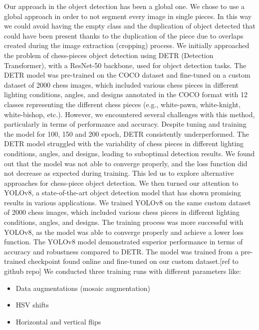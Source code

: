 Our approach in the object detection has been a global one.
We chose to use a global approach in order to not segment every image in single pieces.
In this way we could avoid having the empty class and the duplication of object detected that could have been present thanks to the duplication of the piece due to overlaps created during the image extraction (cropping) process.
\newline
We initially approached the problem of chess-pieces object detection using DETR (Detection Transformer), with a ResNet-50 backbone, used for object detection tasks.
The DETR model was pre-trained on the COCO dataset and fine-tuned on a custom dataset of 2000 chess images, which included various chess pieces in different lighting conditions,
 angles, and designs annotated in the COCO format with 12 classes representing the different chess pieces (e.g., white-pawn, white-knight, white-bishop, etc.).
However, we encountered several challenges with this method, particularly in terms of performance and accuracy.
Despite tuning and training the model for 100, 150 and 200 epoch, DETR consistently underperformed.
The DETR model struggled with the variability of chess pieces in different lighting conditions, angles, and designs, leading to suboptimal detection results.
We found out that the model was not able to converge properly, and the loss function did not decrease as expected during training.
This led us to explore alternative approaches for chess-piece object detection.
\newline
We then turned our attention to YOLOv8, a state-of-the-art object detection model that has shown promising results in various applications.
We trained YOLOv8 on the same custom dataset of 2000 chess images, which included various chess pieces in different lighting conditions, angles, and designs.
The training process was more successful with YOLOv8, as the model was able to converge properly and achieve a lower loss function.
The YOLOv8 model demonstrated superior performance in terms of accuracy and robustness compared to DETR.
\newline
The model was trained from a pre-trained checkpoint found online and fine-tuned on our custom dataset.[ref to github repo]
We conducted three training runs with different parameters like:
\begin{itemize}
    \item Data augmentations (mosaic augmentation)
    \item HSV shifts
    \item Horizontal and vertical flips
\end{itemize}
